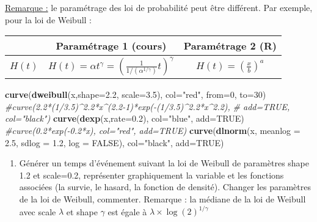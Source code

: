 \documentclass[
]{article}
\newenvironment{Shaded}{\begin{snugshade}}{\end{snugshade}}
\newcommand{\CommentTok}[1]{\textcolor[rgb]{0.56,0.35,0.01}{\textit{#1}}}
\newcommand{\DataTypeTok}[1]{\textcolor[rgb]{0.13,0.29,0.53}{#1}}
\newcommand{\DecValTok}[1]{\textcolor[rgb]{0.00,0.00,0.81}{#1}}
\newcommand{\FloatTok}[1]{\textcolor[rgb]{0.00,0.00,0.81}{#1}}
\newcommand{\KeywordTok}[1]{\textcolor[rgb]{0.13,0.29,0.53}{\textbf{#1}}}
\newcommand{\NormalTok}[1]{#1}
\newcommand{\OtherTok}[1]{\textcolor[rgb]{0.56,0.35,0.01}{#1}}
\newcommand{\StringTok}[1]{\textcolor[rgb]{0.31,0.60,0.02}{#1}}
\providecommand{\tightlist}{%
  \setlength{\itemsep}{0pt}\setlength{\parskip}{0pt}}
\begin{document}
\underline{Remarque :} le paramétrage des loi de probabilité peut être
différent. Par exemple, pour la loi de Weibull :

\begin{tabular}{|c|c|c|}
\hline
 & Paramétrage 1 (cours) & Paramétrage 2 (R) \\
 \hline
 $H(t)$ & $H(t) = \alpha t^\gamma=\left(\frac{1}{1/(\alpha^{1/\gamma})}t\right)^{\gamma}$ & $H(t) = \left(\frac{x}{b}\right)^{a}$  \\
\hline 
\end{tabular}

\begin{Shaded}
\begin{Highlighting}[]
\KeywordTok{curve}\NormalTok{(}\KeywordTok{dweibull}\NormalTok{(x,}\DataTypeTok{shape=}\FloatTok{2.2}\NormalTok{, }\DataTypeTok{scale=}\FloatTok{3.5}\NormalTok{), }\DataTypeTok{col=}\StringTok{"red"}\NormalTok{, }\DataTypeTok{from=}\DecValTok{0}\NormalTok{, }\DataTypeTok{to=}\DecValTok{30}\NormalTok{)}
\CommentTok{#curve(2.2*(1/3.5)^2.2*x^(2.2-1)*exp(-(1/3.5)^2.2*x^2.2), }
\CommentTok{#     add=TRUE, col="black")}
\KeywordTok{curve}\NormalTok{(}\KeywordTok{dexp}\NormalTok{(x,}\DataTypeTok{rate=}\FloatTok{0.2}\NormalTok{), }\DataTypeTok{col=}\StringTok{"blue"}\NormalTok{, }\DataTypeTok{add=}\OtherTok{TRUE}\NormalTok{)}
\CommentTok{#curve(0.2*exp(-0.2*x), col="red", add=TRUE)}
\KeywordTok{curve}\NormalTok{(}\KeywordTok{dlnorm}\NormalTok{(x, }\DataTypeTok{meanlog =} \FloatTok{2.5}\NormalTok{, }\DataTypeTok{sdlog =} \FloatTok{1.2}\NormalTok{, }\DataTypeTok{log =} \OtherTok{FALSE}\NormalTok{), }
                                \DataTypeTok{col=}\StringTok{"black"}\NormalTok{, }\DataTypeTok{add=}\OtherTok{TRUE}\NormalTok{)}
\end{Highlighting}
\end{Shaded}

\begin{enumerate}
\def\labelenumi{\arabic{enumi})}
\setcounter{enumi}{9}
\tightlist
\item
  Générer un temps d'événement suivant la loi de Weibull de paramètres
  shape 1.2 et scale=0.2, représenter graphiquement la variable et les
  fonctions associées (la survie, le hasard, la fonction de densité).
  Changer les paramètres de la loi de Weibull, commenter. Remarque : la
  médiane de la loi de Weibull avec scale \(\lambda\) et shape
  \(\gamma\) est égale à \(\lambda \times \log(2)^{1/\gamma}\)
\end{enumerate}
\end{document}
